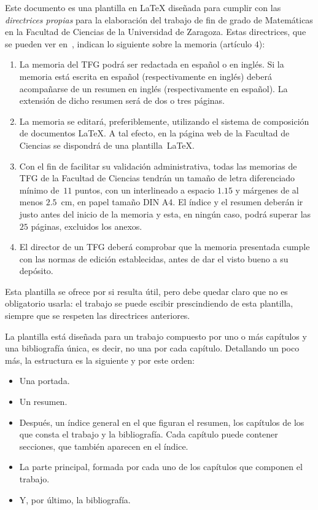 \documentclass[11pt]{book}
\theoremstyle{plain} %
\theoremstyle{definition} %
\begin{document}
Este documento es una plantilla en {\LaTeX} diseñada para cumplir con las 
\emph{directrices propias} para la elaboración del trabajo de fin de grado de 
Matemáticas en la Facultad de Ciencias de la Universidad de Zaragoza. Estas 
directrices, que se pueden ver en~\cite{FC}, indican lo siguiente sobre la 
memoria (artículo $4$):

\begin{enumerate}
\item La memoria del TFG podrá ser redactada en español o en inglés. Si la 
memoria está escrita en español (respectivamente en inglés) deberá acompañarse de 
un resumen en inglés (respectivamente en español). La extensión de dicho resumen 
será de dos o tres páginas.

\item La memoria se editará, preferiblemente, utilizando el sistema de 
composición de documentos {\LaTeX}. A tal efecto, en la página web de la Facultad 
de Ciencias se dispondrá de una plantilla~{\LaTeX}.

\item Con el fin de facilitar su validación administrativa, todas las memorias de 
TFG de la Facultad de Ciencias tendrán un tamaño de letra diferenciado mínimo 
de~$11$ puntos, con un interlineado a espacio $1.15$ y márgenes de al menos 
$2.5$~cm, en papel tamaño DIN A4. El índice y el resumen deberán ir justo antes 
del inicio de la memoria y esta, en ningún caso, podrá superar las $25$ páginas, 
excluidos los anexos.

\item El director de un TFG deberá comprobar que la memoria presentada cumple con 
las normas de edición establecidas, antes de dar el visto bueno a su depósito.
\end{enumerate}

Esta plantilla se ofrece por si resulta útil, pero 
debe quedar claro que no es obligatorio usarla: el trabajo se puede escibir prescindiendo de esta plantilla, siempre que se respeten las directrices anteriores.

La plantilla está diseñada para un trabajo compuesto por uno o más capítulos y una 
bibliografía única, es decir, no una por cada capítulo. Detallando un poco más, 
la estructura es la siguiente y por este orden:
\begin{itemize}
\item Una portada.
\item Un resumen.
\item Después, un índice general en el que figuran el resumen, los capítulos de 
los que consta el trabajo y la bibliografía. 
Cada capítulo puede contener secciones, que también aparecen en el índice.
\item La parte principal, formada por cada uno de los capítulos que componen el 
trabajo.
\item Y, por último, la bibliografía.
\end{itemize}
\end{document}
